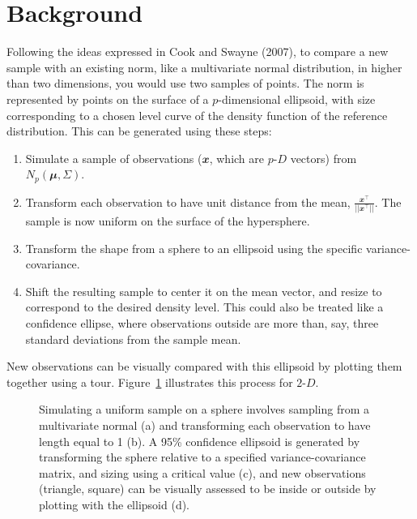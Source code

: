 \documentclass[
  12pt,
]{interact}
\providecommand{\tightlist}{%
  \setlength{\itemsep}{0pt}\setlength{\parskip}{0pt}}\usepackage{longtable,booktabs,array}
\def\tightlist{}
\newcommand\pD{$p\text{-}D$}
\newcommand\gD{$2\text{-}D$}
\begin{document}
\section{Background}\label{sec-background}

Following the ideas expressed in Cook and Swayne (2007), to compare a
new sample with an existing norm, like a multivariate normal
distribution, in higher than two dimensions, you would use two samples
of points. The norm is represented by points on the surface of a
\(p\)-dimensional ellipsoid, with size corresponding to a chosen level
curve of the density function of the reference distribution. This can be
generated using these steps:

\begin{enumerate}
\def\labelenumi{\arabic{enumi}.}
\tightlist
\item
  Simulate a sample of observations (\(\mathbfit{x}\), which are \pD{}
  vectors) from \(N_p(\mathbfit{\mu}, \Sigma)\).
\item
  Transform each observation to have unit distance from the mean,
  \(\frac{\mathbfit{x}^\top}{||\mathbfit{x}^\top||}\). The sample is now
  uniform on the surface of the hypersphere.
\item
  Transform the shape from a sphere to an ellipsoid using the specific
  variance-covariance.
\item
  Shift the resulting sample to center it on the mean vector, and resize
  to correspond to the desired density level. This could also be treated
  like a confidence ellipse, where observations outside are more than,
  say, three standard deviations from the sample mean.
\end{enumerate}

New observations can be visually compared with this ellipsoid by
plotting them together using a tour. Figure~\ref{fig-ci} illustrates
this process for \gD.

\begin{figure}


\caption{\label{fig-ci}Simulating a uniform sample on a sphere involves
sampling from a multivariate normal (a) and transforming each
observation to have length equal to 1 (b). A 95\% confidence ellipsoid
is generated by transforming the sphere relative to a specified
variance-covariance matrix, and sizing using a critical value (c), and
new observations (triangle, square) can be visually assessed to be
inside or outside by plotting with the ellipsoid (d).}

\end{figure}%
\end{document}
